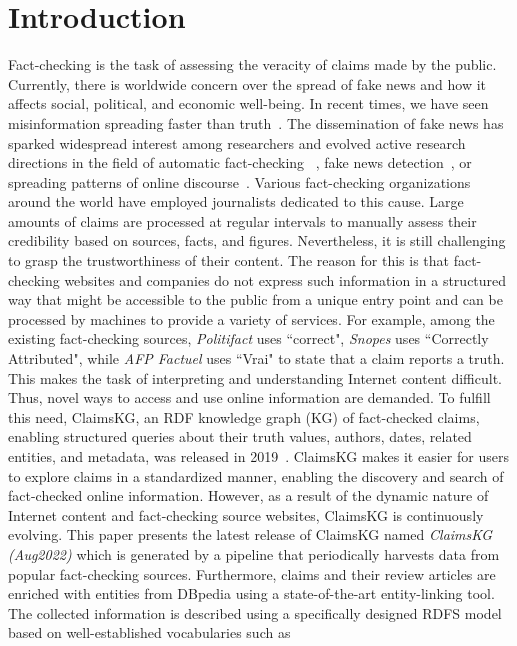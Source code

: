 \documentclass[
]{ceurart}
\begin{document}
\section{Introduction}
\vspace{-2mm}
Fact-checking is the task of assessing the veracity of claims made by the public. Currently, there is worldwide concern over the spread of fake news and how it affects social, political, and economic well-being. In recent times, we have seen misinformation spreading faster than truth~\cite{vosoughi2018spread}. The dissemination of fake news has sparked widespread interest among researchers and evolved active research directions in the field of automatic fact-checking ~\cite{hassan2015quest}, fake news detection~\cite{tschiatschek2018fake}, or spreading patterns of online discourse~\cite{pennycook2020understanding}. Various fact-checking organizations around the world have employed journalists dedicated to this cause. Large amounts of claims are processed at regular intervals to manually assess their credibility based on sources, facts, and figures. Nevertheless, it is still challenging to grasp the trustworthiness of their content. The reason for this is that fact-checking websites and companies do not express such information in a structured way that might be accessible to the public from a unique entry point and can be processed by machines to provide a variety of services. For example, among the existing fact-checking sources,  \textit{Politifact} uses ``correct", \textit{Snopes}  uses ``Correctly Attributed", while \textit{AFP Factuel} uses ``Vrai"  to state that a claim reports a truth. This makes the task of interpreting and understanding Internet content difficult.  Thus, novel ways to access and use online information are demanded. To fulfill this need,  ClaimsKG, an RDF knowledge graph (KG) of fact-checked claims, enabling structured queries about their truth values, authors, dates, related entities, and metadata, was released in 2019~\cite{tchechmedjiev2019claimskg}.  ClaimsKG makes it easier for users to explore claims in a standardized manner, enabling the discovery and search of fact-checked online information. However, as a result of the dynamic nature of Internet content and fact-checking source websites,
 ClaimsKG is continuously evolving. This paper presents the latest release of ClaimsKG named \textit{ClaimsKG (Aug2022)} which is generated by a pipeline that periodically harvests data from popular fact-checking sources.  Furthermore, claims and their review articles are enriched with entities from DBpedia using a state-of-the-art entity-linking tool. The collected information is described using a specifically designed RDFS model based on well-established vocabularies such as 
\end{document}
